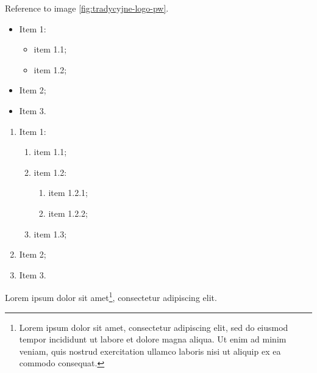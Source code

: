 \lipsum[2] Reference to image \ref{fig:tradycyjne-logo-pw}.

\begin{itemize}
    \item Item 1:
    \begin{itemize}[label=---]
        \item item 1.1;
        \item item 1.2;
    \end{itemize}
    \item Item 2;
    \item Item 3.
\end{itemize}

\lipsum[3]

\begin{enumerate}
    \item Item 1:
    \begin{enumerate}
        \item item 1.1;
        \item item 1.2:
        \begin{enumerate}
            \item item 1.2.1;
            \item item 1.2.2;
        \end{enumerate}
        \item item 1.3;
    \end{enumerate}
    \item Item 2;
    \item Item 3.
\end{enumerate}

\lipsum[4] Lorem ipsum dolor sit amet\footnote{Lorem ipsum dolor sit amet, consectetur adipiscing elit, sed do eiusmod tempor incididunt ut labore et dolore magna aliqua. Ut enim ad minim veniam, quis nostrud exercitation ullamco laboris nisi ut aliquip ex ea commodo consequat.}, consectetur adipiscing elit.

